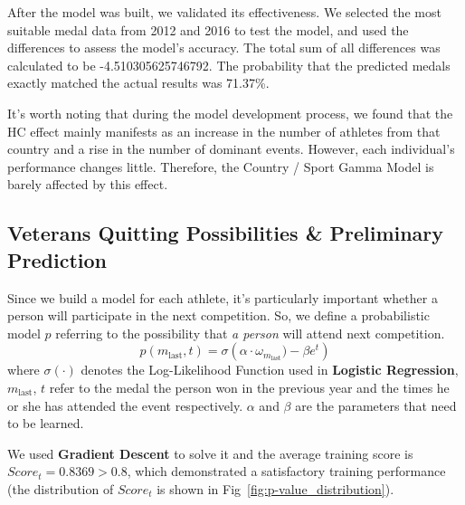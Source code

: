\documentclass{mcmthesis}
\begin{document}
After the model was built, we validated its effectiveness. We selected the most suitable medal data from 2012 and 2016 to test the model, and used the differences to assess the model's accuracy. The total sum of all differences was calculated to be -4.510305625746792. The probability that the predicted medals exactly matched the actual results was 71.37\%.

It's worth noting that during the model development process, we found that the HC effect mainly manifests as an increase in the number of athletes from that country and a rise in the number of dominant events. However, each individual's performance changes little. Therefore, the Country / Sport Gamma Model is barely affected by this effect.

\subsection{Veterans Quitting Possibilities \& Preliminary Prediction}

Since we build a model for each athlete, it's particularly important whether a person will participate in the next competition. So, we define a probabilistic model $p$ referring to the possibility that \textit{a person} will attend next competition.
\[
p(m_{\text{last}}, t) = \sigma \left( \alpha \cdot \omega_{m_{\text{last}}}) - \beta e^{t} \right)
\]
where $\sigma(\cdot)$ denotes the Log-Likelihood Function used in \textbf{Logistic Regression}, $m_{\text{last}}$, $t$ refer to the medal the person won in the previous year and the times he or she has attended the event respectively. $\alpha$ and $\beta$ are the parameters that need to be learned.

We used \textbf{Gradient Descent} to solve it and the average training score is $Score_t = 0.8369 > 0.8$, which demonstrated a satisfactory training performance (the distribution of $Score_t$ is shown in Fig~\ref{fig:p-value_distribution}).
\end{document}
